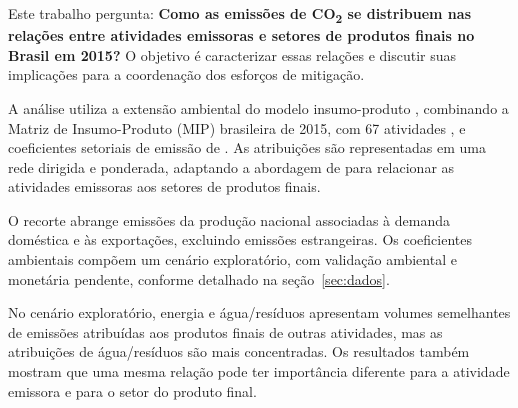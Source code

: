 Este trabalho pergunta: \textbf{Como as emissões de CO\textsubscript{2} se distribuem nas relações entre atividades emissoras e setores de produtos finais no Brasil em 2015?} O objetivo é caracterizar essas relações e discutir suas implicações para a coordenação dos esforços de mitigação.

A análise utiliza a extensão ambiental do modelo insumo-produto \parencite{millerBlair2009}, combinando a Matriz de Insumo-Produto (MIP) brasileira de 2015, com 67 atividades \parencite{ibge2015mip}, e coeficientes setoriais de emissão de \textcite{sanguinetAzzoni2024}. As atribuições são representadas em uma rede dirigida e ponderada, adaptando a abordagem de \textcite{huang2019} para relacionar as atividades emissoras aos setores de produtos finais.

O recorte abrange emissões da produção nacional associadas à demanda doméstica e às exportações, excluindo emissões estrangeiras. Os coeficientes ambientais compõem um cenário exploratório, com validação ambiental e monetária pendente, conforme detalhado na seção~\ref{sec:dados}.

No cenário exploratório, energia e água/resíduos apresentam volumes semelhantes de emissões atribuídas aos produtos finais de outras atividades, mas as atribuições de água/resíduos são mais concentradas. Os resultados também mostram que uma mesma relação pode ter importância diferente para a atividade emissora e para o setor do produto final.
